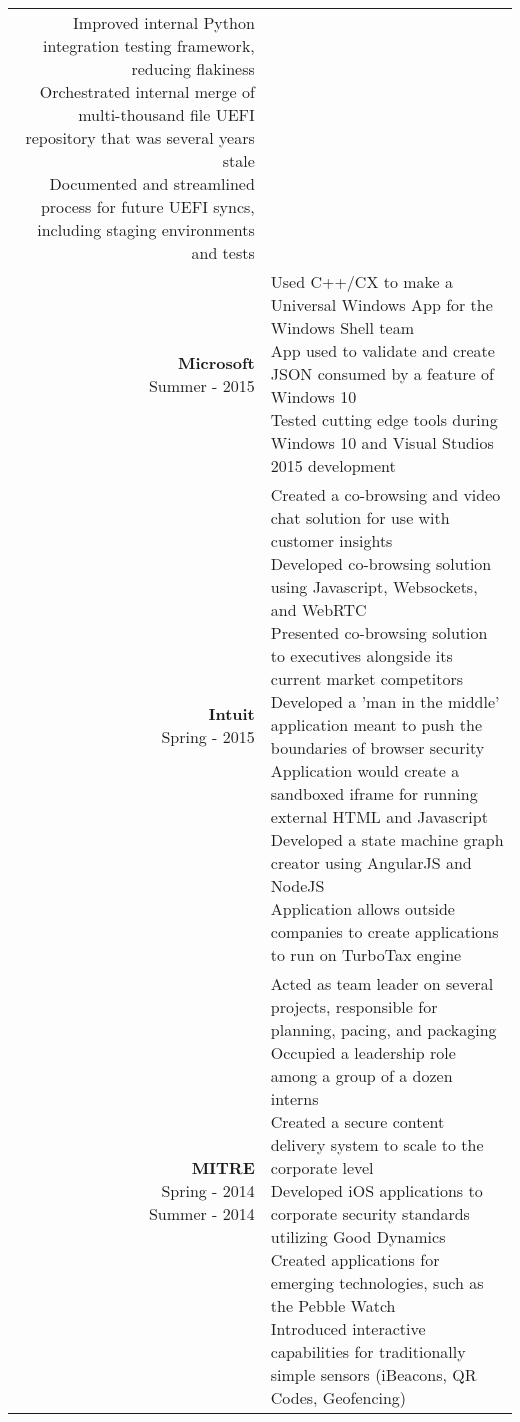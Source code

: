 \documentclass{article}
\makeatletter
\newcommand*\lineBr[2][c]{\begin{tabular}[#1]{@{}r@{}}#2\end{tabular}}
\newcommand*\lineBl[2][c]{\begin{tabular}[#1]{@{}l@{}}#2\end{tabular}}
\makeatother
\begin{document}
\begin{tabularx}{\textwidth}{ r | X }
{    Improved internal Python integration testing framework, reducing flakiness \\[2mm]
    Orchestrated internal merge of multi-thousand file UEFI repository that was several years stale \\[2mm]
    Documented and streamlined process for future UEFI syncs, including staging environments and tests \\[2mm]
  } \\
  \vspace{4mm}
  \lineBr{ {\large {\bf Microsoft }\\[2mm]Summer - 2015}} &
  \lineBl{
    Used C++/CX to make a Universal Windows App for the Windows Shell team \\[2mm] 
    App used to validate and create JSON consumed by a feature of Windows 10 \\[2mm]
    Tested cutting edge tools during Windows 10 and Visual Studios 2015 development 
  } \\
  \vspace{4mm}
  \lineBr{ {\large {\bf Intuit }\\[2mm]Spring - 2015}} &
  \lineBl{
    Created a co-browsing and video chat solution for use with customer insights \\[2mm]
    Developed co-browsing solution using Javascript, Websockets, and WebRTC \\[2mm]
    Presented co-browsing solution to executives alongside its current market competitors \\[2mm]
    Developed a 'man in the middle' application meant to push the boundaries of browser security \\[2mm]
    Application would create a sandboxed iframe for running external HTML and Javascript \\[2mm]
    Developed a state machine graph creator using AngularJS and NodeJS \\[2mm]
    Application allows outside companies to create applications to run on TurboTax engine
  } \\
  \vspace{4mm}
  \lineBr{ {\large {\bf MITRE }\\[2mm]Spring - 2014\\Summer - 2014}} &
  \lineBl{
    Acted as team leader on several projects, responsible for planning, pacing, and packaging \\[2mm]
    Occupied a leadership role among a group of a dozen interns \\[2mm]
    Created a secure content delivery system to scale to the corporate level \\[2mm]
    Developed iOS applications to corporate security standards utilizing Good Dynamics \\[2mm]
    Created applications for emerging technologies, such as the Pebble Watch \\[2mm]
    Introduced interactive capabilities for traditionally simple sensors (iBeacons, QR Codes, Geofencing) \\[2mm]
  }
\end{tabularx}
\end{document}
